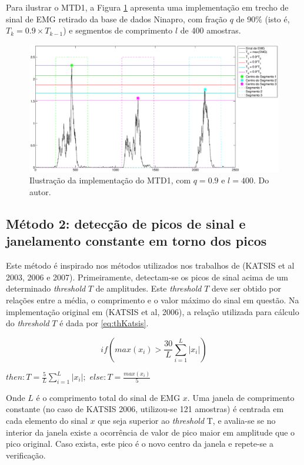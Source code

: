 \documentclass[
	12pt,				%
	openright,			%
	oneside,
	a4paper,			%
	english,			%
	francais,			%
	spanish,			%
	brazil				%
	]{abntex2}
\begin{document}
	Para ilustrar o MTD1, a Figura \ref{fig:mtd1example} apresenta uma implementação em trecho de sinal de EMG retirado da base de dados Ninapro, com fração $q$ de 90\% (isto é, $T_k = 0.9\times T_{k-1}$) e segmentos de comprimento $l$ de 400 amostras.
 
\begin{figure}
\centering
\includegraphics[width=\linewidth]{./img/mtd1example.eps}
\caption{Ilustração da implementação do MTD1, com $q = 0.9$ e $l = 400$. Do autor.}
\label{fig:mtd1example}
\end{figure}
 
\subsection{Método 2: detecção de picos de sinal e janelamento constante em torno dos picos}

	Este método é inspirado nos métodos utilizados nos trabalhos de (KATSIS et al 2003, 2006 e 2007). Primeiramente, detectam-se os picos de sinal acima de um determinado \emph{threshold} $T$ de amplitudes. Este \emph{threshold} $T$ deve ser obtido por relações entre a média, o comprimento e o valor máximo do sinal em questão. Na implementação original em (KATSIS et al, 2006), a relação utilizada para cálculo do \emph{threshold} $T$ é dada por \ref{eq:thKatsis}.

\begin{equation}
\label{eq:thKatsis}
  if\left(max(x_i) > \frac{30}{L}\sum_{i=1}^{L}|x_i|\right)
\end{equation}
\begin{center}
$then: T = \frac{5}{L}\sum_{i=1}^{L}|x_i|;$
$else: T = \frac{max(x_i)}{5}$
\end{center}

	Onde $L$ é o comprimento total do sinal de EMG $x$. Uma janela de comprimento constante (no caso de KATSIS 2006, utilizou-se 121 amostras) é centrada em cada elemento do sinal $x$ que seja superior ao \emph{threshold} T, e avalia-se se no interior da janela existe a ocorrência de valor de pico maior em amplitude que o pico original. Caso exista, este pico é o novo centro da janela e repete-se a verificação.
\end{document}
